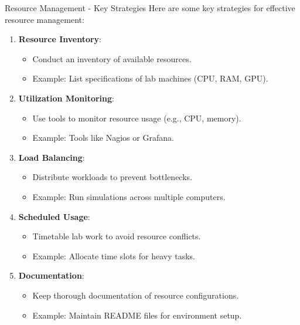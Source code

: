 \documentclass[aspectratio=169]{beamer}
\begin{document}
\begin{frame}[fragile]{Resource Management - Key Strategies}
  Here are some key strategies for effective resource management:
  \begin{enumerate}
    \item \textbf{Resource Inventory}:
    \begin{itemize}
      \item Conduct an inventory of available resources.
      \item Example: List specifications of lab machines (CPU, RAM, GPU).
    \end{itemize}
    
    \item \textbf{Utilization Monitoring}:
    \begin{itemize}
      \item Use tools to monitor resource usage (e.g., CPU, memory).
      \item Example: Tools like Nagios or Grafana.
    \end{itemize}
    
    \item \textbf{Load Balancing}:
    \begin{itemize}
      \item Distribute workloads to prevent bottlenecks.
      \item Example: Run simulations across multiple computers.
    \end{itemize}
    
    \item \textbf{Scheduled Usage}:
    \begin{itemize}
      \item Timetable lab work to avoid resource conflicts.
      \item Example: Allocate time slots for heavy tasks.
    \end{itemize}
    
    \item \textbf{Documentation}:
    \begin{itemize}
      \item Keep thorough documentation of resource configurations.
      \item Example: Maintain README files for environment setup.
    \end{itemize}
  \end{enumerate}
\end{frame}
\end{document}
